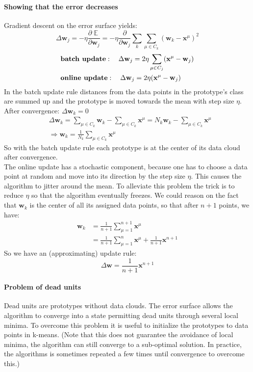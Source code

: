 \documentclass[11pt]{article}
\DeclareMathOperator{\E}{\mathbb{E}}
\begin{document}
\paragraph{Showing that the error decreases}
Gradient descent on the error surface yields: 
\[
\Delta \mathbf{w}_j = -\eta \frac{\partial\E}{\partial\mathbf{w}_j} = -\eta \frac{\partial}{\partial\mathbf{w}_j} \sum_k \sum_{\mu \in C_k} (\mathbf{w}_k-\mathbf{x}^\mu)^2
\]
\begin{align*}
&\text{\textbf{batch update}}: \quad\Delta \mathbf{w}_j
= 2\eta \sum_{\mu \in C_j}(\mathbf{x^\mu}-\mathbf{w}_j)\\
&\text{\textbf{online update}}: \quad\Delta \mathbf{w}_j
= 2\eta (\mathbf{x^\mu}-\mathbf{w}_j)
\end{align*}
In the batch update rule distances from the data points in the prototype's class are summed up and the prototype is moved towards the mean with step size $\eta$.\\
After convergence: $\Delta \mathbf{w}_k=0$
\begin{align*}
&\Delta \mathbf{w}_k = \sum_{\mu \in C_k}\mathbf{w}_k-\sum_{\mu \in C_k}\mathbf{x}^\mu=N_k\mathbf{w}_k-\sum_{\mu \in C_k}\mathbf{x}^\mu\\
&\Rightarrow \mathbf{w}_k=\frac{1}{N_k}\sum_{\mu \in C_k}\mathbf{x}^\mu
\end{align*}
So with the batch update rule each prototype is at the center of its data cloud after convergence.\\
The online update has a stochastic component, because one has to choose a data point at random and move into its direction by the step size $\eta$. This causes the algorithm to jitter around the mean. To alleviate this problem the trick is to reduce $\eta$ so that the algorithm eventually freezes. We could reason on the fact that $\mathbf{w}_k$ is the center of all its assigned data points, so that after $n+1$ points, we have:
\begin{align*}
\mathbf{w}_k &= \frac{1}{n+1} \sum \limits_{\mu=1}^{n+1}\mathbf{x}^\mu\\
&= \frac{1}{n+1}\sum\limits_{\mu=1}^{n}\mathbf{x}^\mu + \frac{1}{n+1}\mathbf{x}^{n+1}
\end{align*}
So we have an (approximating) update rule:
\[\Delta \mathbf{w} = \frac{1}{n+1} \mathbf{x}^{n+1}\]
\paragraph{Problem of dead units}
Dead units are prototypes without data clouds. The error surface allows the algorithm to converge into a state permitting dead units through several local minima. To overcome this problem it is useful to initialize the prototypes to data points in k-means. (Note that this does not guarantee the avoidance of local minima, the algorithm can still converge to a sub-optimal solution. In practice, the algorithms is sometimes repeated a few times until convergence to overcome this.)
\end{document}
